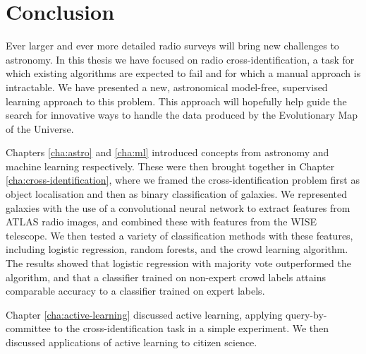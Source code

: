 
\chapter{Conclusion}
\label{cha:conclusion}

    Ever larger and ever more detailed radio surveys will bring new challenges
    to astronomy. In this thesis we have focused on radio cross-identification,
    a task for which existing algorithms are expected to fail and for which a
    manual approach is intractable. We have presented a new, astronomical
    model-free, supervised learning approach to this problem. This approach will
    hopefully help guide the search for innovative ways to handle the data
    produced by the Evolutionary Map of the Universe.

    Chapters \ref{cha:astro} and \ref{cha:ml} introduced concepts from astronomy
    and machine learning respectively. These were then brought together in
    Chapter \ref{cha:cross-identification}, where we framed the
    cross-identification problem first as object localisation and then as binary
    classification of galaxies. We represented galaxies with the use of a
    convolutional neural network to extract features from ATLAS radio images,
    and combined these with features from the WISE telescope. We then tested a
    variety of classification methods with these features, including logistic
    regression, random forests, and the \citet{raykar10} crowd learning
    algorithm. The results showed that logistic regression with majority vote
    outperformed the
    \citeauthor{raykar10} algorithm, and that a classifier trained on non-expert
    crowd labels attains comparable accuracy to a classifier trained on expert
    labels.

    Chapter \ref{cha:active-learning} discussed active learning, applying
    query-by-committee to the cross-identification task in a simple experiment. We then discussed applications of active learning to citizen science.

